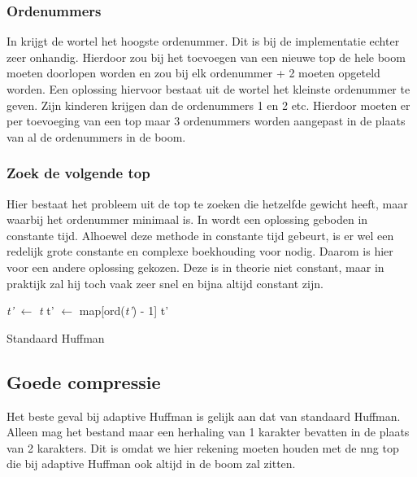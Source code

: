 \documentclass[twoside,twocolumn]{article}
\begin{document}
        \subsubsection{Ordenummers}
             In \cite{cursusAD3} krijgt de wortel het hoogste ordenummer. Dit is bij de implementatie echter
             zeer onhandig.
             Hierdoor zou bij het toevoegen van een nieuwe top de hele boom moeten 
             doorlopen worden en zou bij elk ordenummer + 2 moeten opgeteld worden.
             Een oplossing hiervoor bestaat uit de wortel het kleinste ordenummer te geven. Zijn 
             kinderen krijgen dan de ordenummers 1 en 2 etc.
             Hierdoor moeten er per toevoeging van een top maar 3 ordenummers worden aangepast 
             in de plaats van al de ordenummers in de boom.


        \subsubsection{Zoek de volgende top}
            Hier bestaat het probleem uit de top te zoeken die hetzelfde gewicht heeft, maar waarbij het ordenummer minimaal is. 
            In \cite{knuth85} wordt een oplossing geboden in constante tijd. %
            Alhoewel deze methode in constante tijd gebeurt, is er wel een redelijk grote
            constante en complexe boekhouding voor nodig.
            Daarom is hier voor een andere oplossing gekozen. Deze is in theorie niet constant,
            maar in praktijk zal hij toch vaak zeer snel en bijna altijd constant zijn.
            
            \begin{algorithm}
                \begin{algorithmic}[1]
                        \State \textit{t'} $\gets$ \textit{t}
                        \State t' $\gets$ map[ord(\textit{t'}) - 1]
                        \EndWhile 
                        \State \Return t'
                    \EndProcedure
                \end{algorithmic}
                \caption{Standaard Huffman}
                \label{alg:zoekvolgende}

            \end{algorithm}
            
    \subsection{Goede compressie}
    Het beste geval bij adaptive Huffman is gelijk aan dat van standaard Huffman. Alleen mag het bestand maar een herhaling van 1 karakter bevatten in de plaats van 2 karakters. Dit is omdat we hier rekening moeten houden met de nng top die bij adaptive Huffman ook altijd in de boom zal zitten.
\end{document}
